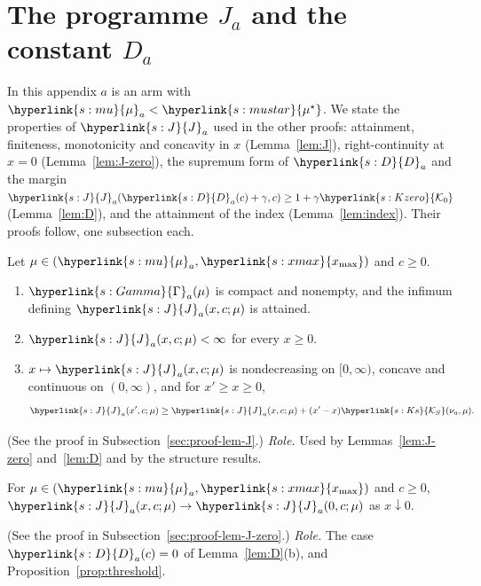 \documentclass[11pt]{article}
\newcommand{\sy}[2]{{\hyperlink{#1}{#2}}}
\newcommand{\xmax}{\sy{s:xmax}{x_{\max}}}
\newcommand{\Ks}{\sy{s:Ks}{\mathcal{K}_{S}}}
\newcommand{\mk}{\sy{s:mu}{\mu}}
\newcommand{\mus}{\sy{s:mustar}{\mu^{\star}}}
\newcommand{\Pairs}{\sy{s:Gamma}{\Gamma}}
\newcommand{\Jf}{\sy{s:J}{J}}
\newcommand{\Dc}{\sy{s:D}{D}}
\newcommand{\Ko}{\sy{s:Kzero}{\mathcal{K}_{0}}}
\begin{document}
\section{The programme \texorpdfstring{$J_a$}{J} and the constant \texorpdfstring{$D_a$}{D}}\label{sec:proof-J}

In this appendix $a$ is an arm with $\mk_a<\mus$. We state the properties of $\Jf_a$ used in the
other proofs: attainment, finiteness, monotonicity and concavity in $x$ (Lemma~\ref{lem:J}),
right-continuity at $x=0$ (Lemma~\ref{lem:J-zero}), the supremum form of $\Dc_a$ and the margin
$\Jf_a(\Dc_a(c)+\gamma,c)\ge1+\gamma\Ko$ (Lemma~\ref{lem:D}), and the attainment of the index
(Lemma~\ref{lem:index}). Their proofs follow, one subsection each.

\begin{lemma}\label{lem:J}
Let $\mu\in(\mk_a,\xmax)$ and $c\ge0$.
\begin{enumerate}
\item[(a)] $\Pairs_a(\mu)$ is compact and nonempty, and the infimum defining $\Jf_a(x,c;\mu)$ is
  attained.
\item[(b)] $\Jf_a(x,c;\mu)<\infty$ for every $x\ge0$.
\item[(c)] $x\mapsto \Jf_a(x,c;\mu)$ is nondecreasing on $[0,\infty)$, concave and continuous on
  $(0,\infty)$, and for $x'\ge x\ge0$,
  \begin{equation*}
  \Jf_a(x',c;\mu)\ge \Jf_a(x,c;\mu)+(x'-x)\Ks(\nu_a,\mu).
  \end{equation*}
\end{enumerate}
\end{lemma}

(See the proof in Subsection~\ref{sec:proof-lem-J}.) \emph{Role.} Used by Lemmas~\ref{lem:J-zero}
and~\ref{lem:D} and by the structure results.

\begin{lemma}\label{lem:J-zero}
For $\mu\in(\mk_a,\xmax)$ and $c\ge0$, $\Jf_a(x,c;\mu)\to \Jf_a(0,c;\mu)$ as $x\downarrow0$.
\end{lemma}

(See the proof in Subsection~\ref{sec:proof-lem-J-zero}.) \emph{Role.} The case $\Dc_a(c)=0$ of
Lemma~\ref{lem:D}(b), and Proposition~\ref{prop:threshold}.
\end{document}
